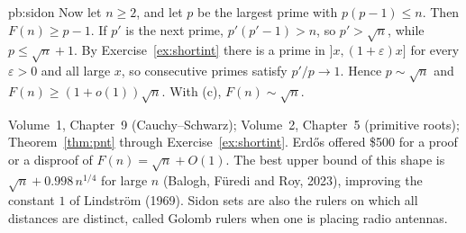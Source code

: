 \begin{solution}{pb:sidon}
Now let $n\ge2$, and let $p$ be the largest prime with $p(p-1)\le n$. Then $F(n)\ge p-1$. If $p'$ is the next prime, $p'(p'-1)>n$, so $p'>\sqrt n$, while $p\le\sqrt n+1$. By Exercise~\ref{ex:shortint} there is a prime in $]x,(1+\varepsilon)x]$ for every $\varepsilon>0$ and all large $x$, so consecutive primes satisfy $p'/p\to1$. Hence $p\sim\sqrt n$ and $F(n)\ge(1+o(1))\sqrt n$. With (c), $F(n)\sim\sqrt n$.

\tools Volume~1, Chapter~9 (Cauchy--Schwarz); Volume~2, Chapter~5 (primitive roots); Theorem~\ref{thm:pnt} through Exercise~\ref{ex:shortint}.
\leads Erdős offered \$500 for a proof or a disproof of $F(n)=\sqrt n+O(1)$. The best upper bound of this shape is $\sqrt n+0.998\,n^{1/4}$ for large $n$ (Balogh, Füredi and Roy, 2023), improving the constant $1$ of Lindström (1969). Sidon sets are also the rulers on which all distances are distinct, called Golomb rulers when one is placing radio antennas.
\end{solution}

